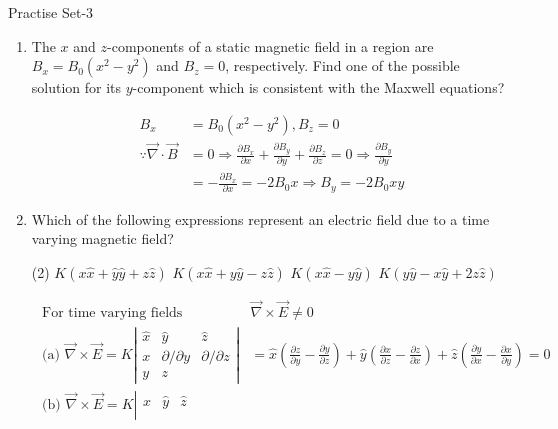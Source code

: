 \begin{enumerate}
\newpage
\begin{abox}
	Practise Set-3
\end{abox}
\begin{enumerate}
	\item 	The $x$ and $z$-components of a static magnetic field in a region are $B_{x}=B_{0}\left(x^{2}-y^{2}\right)$ and $B_{z}=0$, respectively. Find one of the possible solution for its $y$-component which is consistent with the Maxwell equations?
	\begin{answer}
		\begin{align*}
		 B_{x}&=B_{0}\left(x^{2}-y^{2}\right), B_{z}=0\\
		\because \vec{\nabla} \cdot \vec{B}&=0 \Rightarrow \frac{\partial B_{x}}{\partial x}+\frac{\partial B_{y}}{\partial y}+\frac{\partial B_{z}}{\partial z}=0 \Rightarrow \frac{\partial B_{y}}{\partial y}\\&=-\frac{\partial B_{x}}{\partial x}=-2 B_{0} x \Rightarrow B_{y}=-2 B_{0} x y
		\end{align*}
	\end{answer}
	\item 	Which of the following expressions represent an electric field due to a time varying magnetic field?
	\begin{tasks}(2)
		\task[\textbf{a.}]$K(x \hat{x}+\hat{y} \hat{y}+z \hat{z})$
		\task[\textbf{b.}]$K(x \hat{x}+y \hat{y}-z \hat{z})$
		\task[\textbf{c.}] $K(x \hat{x}-y \hat{y})$
		\task[\textbf{d.}] $K(y \hat{y}-x \hat{y}+2 z \hat{z})$
	\end{tasks}
\begin{answer}
	\begin{align*}
	\text { For time varying fields } &\vec{\nabla} \times \vec{E} \neq 0\\
	\text { (a) } \vec{\nabla} \times \vec{E}=K\left|\begin{array}{ccc}
	\hat{x} & \hat{y} & \hat{z} \\
	x & \partial / \partial y & \partial / \partial z \\
	y & z
	\end{array}\right|&=\hat{x}\left(\frac{\partial z}{\partial y}-\frac{\partial y}{\partial z}\right)+\hat{y}\left(\frac{\partial x}{\partial z}-\frac{\partial z}{\partial x}\right)+\hat{z}\left(\frac{\partial y}{\partial x}-\frac{\partial x}{\partial y}\right)=0\\
	\text { (b) } \vec{\nabla} \times \vec{E}=K\left|\begin{array}{ccc}
	\hat{x} & \hat{y} & \hat{z} \\

\end{array}
\end{align*}
\end{answer}
\end{enumerate}
\end{enumerate}
